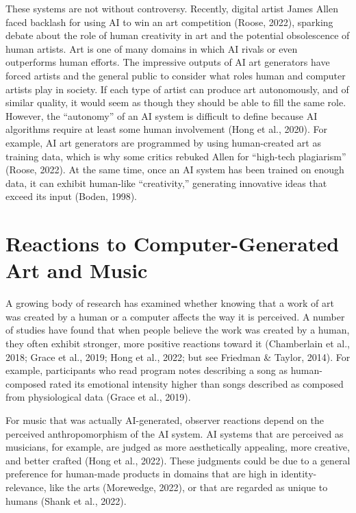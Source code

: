 \documentclass[12pt,twoside]{reedthesis}
\begin{document}
These systems are not without controversy. Recently, digital artist James Allen faced backlash for using AI to win an art competition (Roose, 2022), sparking debate about the role of human creativity in art and the potential obsolescence of human artists. Art is one of many domains in which AI rivals or even outperforms human efforts. The impressive outputs of AI art generators have forced artists and the general public to consider what roles human and computer artists play in society. If each type of artist can produce art autonomously, and of similar quality, it would seem as though they should be able to fill the same role. However, the “autonomy” of an AI system is difficult to define because AI algorithms require at least some human involvement (Hong et al., 2020). For example, AI art generators are programmed by using human-created art as training data, which is why some critics rebuked Allen for “high-tech plagiarism” (Roose, 2022). At the same time, once an AI system has been trained on enough data, it can exhibit human-like “creativity,” generating innovative ideas that exceed its input (Boden, 1998). 

\section{Reactions to Computer-Generated Art and Music
}

A growing body of research has examined whether knowing that a work of art was created by a human or a computer affects the way it is perceived. A number of studies have found that when people believe the work was created by a human, they often exhibit stronger, more positive reactions toward it (Chamberlain et al., 2018; Grace et al., 2019; Hong et al., 2022; but see Friedman \& Taylor, 2014). For example, participants who read program notes describing a song as human-composed rated its emotional intensity higher than songs described as composed from physiological data (Grace et al., 2019). 

For music that was actually AI-generated, observer reactions depend on the perceived anthropomorphism of the AI system. AI systems that are perceived as musicians, for example, are judged as more aesthetically appealing, more creative, and better crafted (Hong et al., 2022). These judgments could be due to a general preference for human-made products in domains that are high in identity-relevance, like the arts (Morewedge, 2022), or that are regarded as unique to humans (Shank et al., 2022).
\end{document}
